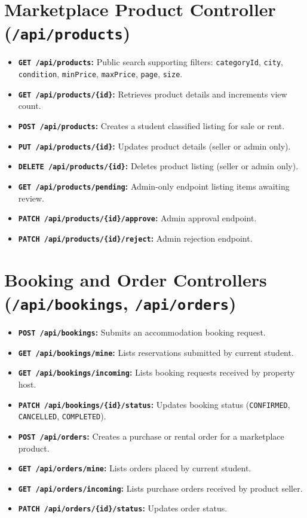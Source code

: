 \section{Marketplace Product Controller (\texttt{/api/products})}
\begin{itemize}
    \item \textbf{\texttt{GET /api/products}:} Public search supporting filters: \texttt{categoryId}, \texttt{city}, \texttt{condition}, \texttt{minPrice}, \texttt{maxPrice}, \texttt{page}, \texttt{size}.
    \item \textbf{\texttt{GET /api/products/\{id\}}:} Retrieves product details and increments view count.
    \item \textbf{\texttt{POST /api/products}:} Creates a student classified listing for sale or rent.
    \item \textbf{\texttt{PUT /api/products/\{id\}}:} Updates product details (seller or admin only).
    \item \textbf{\texttt{DELETE /api/products/\{id\}}:} Deletes product listing (seller or admin only).
    \item \textbf{\texttt{GET /api/products/pending}:} Admin-only endpoint listing items awaiting review.
    \item \textbf{\texttt{PATCH /api/products/\{id\}/approve}:} Admin approval endpoint.
    \item \textbf{\texttt{PATCH /api/products/\{id\}/reject}:} Admin rejection endpoint.
\end{itemize}

\section{Booking and Order Controllers (\texttt{/api/bookings}, \texttt{/api/orders})}
\begin{itemize}
    \item \textbf{\texttt{POST /api/bookings}:} Submits an accommodation booking request.
    \item \textbf{\texttt{GET /api/bookings/mine}:} Lists reservations submitted by current student.
    \item \textbf{\texttt{GET /api/bookings/incoming}:} Lists booking requests received by property host.
    \item \textbf{\texttt{PATCH /api/bookings/\{id\}/status}:} Updates booking status (\texttt{CONFIRMED}, \texttt{CANCELLED}, \texttt{COMPLETED}).
    \item \textbf{\texttt{POST /api/orders}:} Creates a purchase or rental order for a marketplace product.
    \item \textbf{\texttt{GET /api/orders/mine}:} Lists orders placed by current student.
    \item \textbf{\texttt{GET /api/orders/incoming}:} Lists purchase orders received by product seller.
    \item \textbf{\texttt{PATCH /api/orders/\{id\}/status}:} Updates order status.
\end{itemize}

